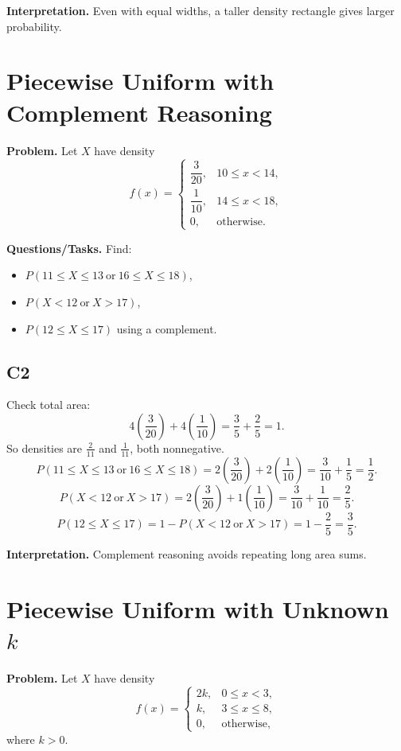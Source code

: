 \textbf{Interpretation.}
Even with equal widths, a taller density rectangle gives larger probability.

\section{Piecewise Uniform with Complement Reasoning}

\textbf{Problem.}
Let $X$ have density
\[
f(x)=
\begin{cases}
\dfrac{3}{20}, & 10\le x<14,\\
\dfrac{1}{10}, & 14\le x<18,\\
0, & \text{otherwise.}
\end{cases}
\]

\textbf{Questions/Tasks.}
Find:
\begin{itemize}
    \item[(a)] $P(11\le X\le 13\ \text{or}\ 16\le X\le 18)$,
    \item[(b)] $P(X<12\ \text{or}\ X>17)$,
    \item[(c)] $P(12\le X\le 17)$ using a complement.
\end{itemize}

\subsection*{C2}
Check total area:
\[
4\left(\frac{3}{20}\right)+4\left(\frac{1}{10}\right)=\frac{3}{5}+\frac{2}{5}=1.
\]
So densities are $\frac{2}{11}$ and $\frac{1}{11}$, both nonnegative.
\[
P(11\le X\le 13\ \text{or}\ 16\le X\le 18)=2\left(\frac{3}{20}\right)+2\left(\frac{1}{10}\right)=\frac{3}{10}+\frac{1}{5}=\frac{1}{2}.
\]
\[
P(X<12\ \text{or}\ X>17)=2\left(\frac{3}{20}\right)+1\left(\frac{1}{10}\right)=\frac{3}{10}+\frac{1}{10}=\frac{2}{5}.
\]
\[
P(12\le X\le 17)=1-P(X<12\ \text{or}\ X>17)=1-\frac{2}{5}=\frac{3}{5}.
\]

\textbf{Interpretation.}
Complement reasoning avoids repeating long area sums.

\section{Piecewise Uniform with Unknown $k$}

\textbf{Problem.}
Let $X$ have density
\[
f(x)=
\begin{cases}
2k, & 0\le x<3,\\
k, & 3\le x\le 8,\\
0, & \text{otherwise,}
\end{cases}
\]
where $k>0$.

